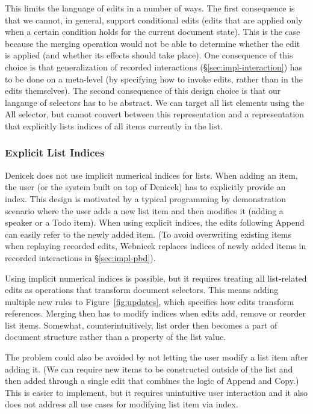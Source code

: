 \documentclass[sigconf,anonymous,screen]{acmart}
\newcommand{\ident}[1]{{\sffamily #1}}
\begin{document}
This limits the language of edits in a number of ways. The first consequence is that we cannot, in
general, support conditional edits (edits that are applied only when a certain condition holds for
the current document state). This is the case because the merging operation would not be able to
determine whether the edit is applied (and whether its effects should take place). One consequence
of this choice is that generalization of recorded interactions (\S\ref{sec:impl-interaction}) has to
be done on a meta-level (by specifying how to invoke edits, rather than in the edits themselves).
The second consequence of this design choice is that our langauge of selectors has to be abstract.
We can target all list elements using the \ident{All} selector, but cannot convert between this
representation and a representation that explicitly lists indices of all items currently in the list.

\subsubsection*{Explicit List Indices}
Denicek does not use implicit numerical indices for lists. When adding an item, the
user (or the system built on top of Denicek) has to explicitly provide an index. This design
is motivated by a typical programming by demonstration scenario where the user adds a
new list item and then modifies it (adding a speaker or a Todo item). When using
explicit indices, the edits following \ident{Append} can easily refer to the newly added
item. (To avoid overwriting existing items when replaying recorded edits, Webnicek replaces
indices of newly added items in recorded interactions in \S\ref{sec:impl-pbd}).

Using implicit numerical indices is possible, but it requires treating all list-related edits
as operations that transform document selectors. This means adding multiple new rules to
Figure~\ref{fig:updates}, which specifies how edits transform references. Merging then has to
modify indices when edits add, remove or reorder list items. Somewhat, counterintuitively, list
order then becomes a part of document structure rather than a property of the list value.

The problem could also be avoided by not letting the user modify a list item after adding it.
(We can require new items to be constructed outside of the list and then added through a
single edit that combines the logic of \ident{Append} and \ident{Copy}.) This is easier to
implement, but it requires unintuitive user interaction and it also does not address all
use cases for modifying list item via index.
\end{document}
